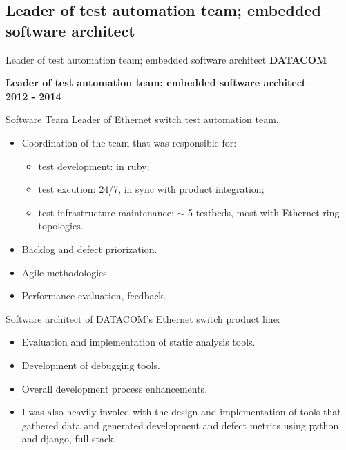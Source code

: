 \documentclass[ignorenonframetext]{beamer}
\providecommand{\tightlist}{\setlength{\itemsep}{0pt}\setlength{\parskip}{0pt}}
\newcommand{\myempha}[1]{{\color{dark27c1}\bf #1}}
\newcommand{\myemphb}[1]{{\color{dark27c2}\bf #1}}
\newcommand{\myemphc}[1]{{\color{dark27c3}\bf #1}}
\begin{document}
\subsection{Leader of test automation team; embedded software architect}
\begin{frame}[allowframebreaks]{Leader of test automation team; embedded software architect}
    \myempha{DATACOM}

    \myemphb{Leader of test automation team; embedded software architect} \\
    \hfill \myemphc{2012 - 2014}

    Software Team Leader of Ethernet switch test automation team.
\begin{itemize}
\tightlist
\item
  Coordination of the team that was responsible for:
\begin{itemize}
  \tightlist
  \item
    test development: in ruby;
  \item
    test excution: 24/7, in sync with product integration;
  \item
    test infrastructure maintenance: \(\sim\) 5 testbeds, most with
    Ethernet ring topologies.
  \end{itemize}
\item
  Backlog and defect priorization.
\item
  Agile methodologies.
\item
  Performance evaluation, feedback.
\end{itemize}

Software architect of DATACOM's Ethernet switch product line:
\begin{itemize}
\tightlist
\item
  Evaluation and implementation of static analysis tools.
\item
  Development of debugging tools.
\item
  Overall development process enhancements.
\item
  I was also heavily involed with the design and implementation of tools
  that gathered data and generated development and defect metrics using
  python and django, full stack.
\end{itemize}

\end{frame}
\end{document}
